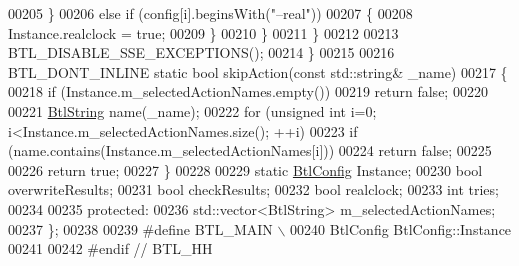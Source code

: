 \begin{DoxyCode}
00205         \}
00206         \textcolor{keywordflow}{else} \textcolor{keywordflow}{if} (config[i].beginsWith(\textcolor{stringliteral}{"--real"}))
00207         \{
00208           Instance.realclock = \textcolor{keyword}{true};
00209         \}
00210       \}
00211     \}
00212 
00213     BTL\_DISABLE\_SSE\_EXCEPTIONS();
00214   \}
00215 
00216   BTL\_DONT\_INLINE \textcolor{keyword}{static} \textcolor{keywordtype}{bool} skipAction(\textcolor{keyword}{const} std::string& \_name)
00217   \{
00218     \textcolor{keywordflow}{if} (Instance.m\_selectedActionNames.empty())
00219       \textcolor{keywordflow}{return} \textcolor{keyword}{false};
00220 
00221     \hyperlink{class_btl_string}{BtlString} name(\_name);
00222     \textcolor{keywordflow}{for} (\textcolor{keywordtype}{unsigned} \textcolor{keywordtype}{int} i=0; i<Instance.m\_selectedActionNames.size(); ++i)
00223       \textcolor{keywordflow}{if} (name.contains(Instance.m\_selectedActionNames[i]))
00224         \textcolor{keywordflow}{return} \textcolor{keyword}{false};
00225 
00226     \textcolor{keywordflow}{return} \textcolor{keyword}{true};
00227   \}
00228 
00229   \textcolor{keyword}{static} \hyperlink{class_btl_config}{BtlConfig} Instance;
00230   \textcolor{keywordtype}{bool} overwriteResults;
00231   \textcolor{keywordtype}{bool} checkResults;
00232   \textcolor{keywordtype}{bool} realclock;
00233   \textcolor{keywordtype}{int} tries;
00234 
00235 \textcolor{keyword}{protected}:
00236   std::vector<BtlString> m\_selectedActionNames;
00237 \};
00238 
00239 \textcolor{preprocessor}{#define BTL\_MAIN \(\backslash\)}
00240 \textcolor{preprocessor}{  BtlConfig BtlConfig::Instance}
00241 
00242 \textcolor{preprocessor}{#endif // BTL\_HH}
\end{DoxyCode}
